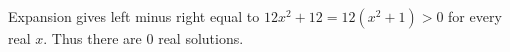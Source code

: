 Expansion gives left minus right equal to $12x^2+12=12(x^2+1)>0$ for every real $x$. Thus there are $\boxed0$ real solutions.
